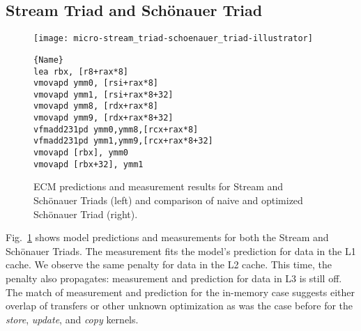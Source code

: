 \documentclass{llncs}
\begin{document}
\subsection{Stream Triad and Sch\"onauer Triad}
\label{sec:res:triads}

\begin{figure}[tb]
\begin{minipage}{.485\textwidth}
    \centering
    \texttt{[image: micro-stream\_triad-schoenauer\_triad-illustrator]}
    \caption{ECM predictions and measurement results for Stream and Sch\"onauer
    Triads (left) and comparison of naive and optimized Sch\"onauer Triad (right).}
    \label{fig:micro-triads}
\end{minipage}\hfill
\begin{minipage}{.50\textwidth}
    \centering
    \vspace{-0.34cm}
\lstset{
        breaklines=true,
        language=C,
basicstyle=\footnotesize\ttfamily,
        numbers=left,
        numberstyle=\tiny,
        frame=tb,
        columns=fullflexible,
        showstringspaces=false
}
\begin{lstlisting}[caption={Shortened two-way unrolled, hand-optimized code for Sch\"onauer Triad. Eight-way unrolling used in real benchmark kernel.}, numbers=right, label=src:schoenauer_lea, captionpos=b, belowcaptionskip=4pt]{Name}
lea rbx, [r8+rax*8]
vmovapd ymm0, [rsi+rax*8]
vmovapd ymm1, [rsi+rax*8+32]
vmovapd ymm8, [rdx+rax*8]
vmovapd ymm9, [rdx+rax*8+32]
vfmadd231pd ymm0,ymm8,[rcx+rax*8]
vfmadd231pd ymm1,ymm9,[rcx+rax*8+32]
vmovapd [rbx], ymm0
vmovapd [rbx+32], ymm1
\end{lstlisting}
\end{minipage}
\end{figure}

Fig.~\ref{fig:micro-triads} shows model predictions and measurements for both
the Stream and Sch\"onauer Triads. The measurement fits the model's prediction
for data in the L1 cache. We observe the same penalty for data in the L2 cache.
This time, the penalty also propagates: measurement and prediction for data in
L3 is still off. The match of measurement and prediction for the in-memory case
suggests either overlap of transfers or other unknown optimization as was the
case before for the \textit{store}, \textit{update}, and \textit{copy}
kernels.
\end{document}

